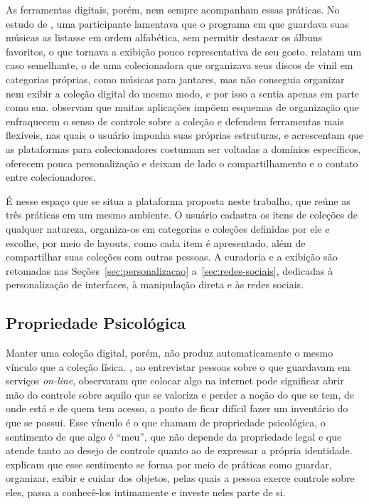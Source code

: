 As ferramentas digitais, porém, nem sempre acompanham essas práticas. No estudo de , uma participante lamentava que o programa
em que guardava suas músicas as listasse em ordem alfabética, sem permitir destacar os álbuns favoritos, o que tornava a exibição pouco representativa de seu
gosto.  relatam um caso semelhante, o de uma colecionadora que organizava seus discos de vinil em categorias próprias, como músicas para
jantares, mas não conseguia organizar nem exibir a coleção digital do mesmo modo, e por isso a sentia apenas em parte como sua. 
observam que muitas aplicações impõem esquemas de organização que enfraquecem o senso de controle sobre a coleção e defendem ferramentas mais flexíveis, nas quais
o usuário imponha suas próprias estruturas, e  acrescentam que as plataformas para colecionadores costumam ser voltadas a domínios
específicos, oferecem pouca personalização e deixam de lado o compartilhamento e o contato entre colecionadores.

É nesse espaço que se situa a plataforma proposta neste trabalho, que reúne as três práticas em um mesmo ambiente. O usuário cadastra os itens de coleções de
qualquer natureza, organiza-os em categorias e coleções definidas por ele e escolhe, por meio de layouts, como cada item é apresentado, além de compartilhar
suas coleções com outras pessoas. A curadoria e a exibição são retomadas nas Seções~\ref{sec:personalizacao} a~\ref{sec:redes-sociais}, dedicadas à
personalização de interfaces, à manipulação direta e às redes sociais.

\subsection{Propriedade Psicológica}
\label{subsec:propriedade-psicologica}

Manter uma coleção digital, porém, não produz automaticamente o mesmo vínculo que a coleção física. , ao entrevistar pessoas sobre o
que guardavam em serviços \textit{on-line}, observaram que colocar algo na internet pode significar abrir mão do controle sobre aquilo que se valoriza e perder a
noção do que se tem, de onde está e de quem tem acesso, a ponto de ficar difícil fazer um inventário do que se possui. Esse vínculo é o que
 chamam de propriedade psicológica, o sentimento de que algo é ``meu'', que não depende da propriedade legal e que atende tanto
ao desejo de controle quanto ao de expressar a própria identidade.  explicam que esse sentimento se forma por meio de práticas como
guardar, organizar, exibir e cuidar dos objetos, pelas quais a pessoa exerce controle sobre eles, passa a conhecê-los intimamente e investe neles parte de si.

